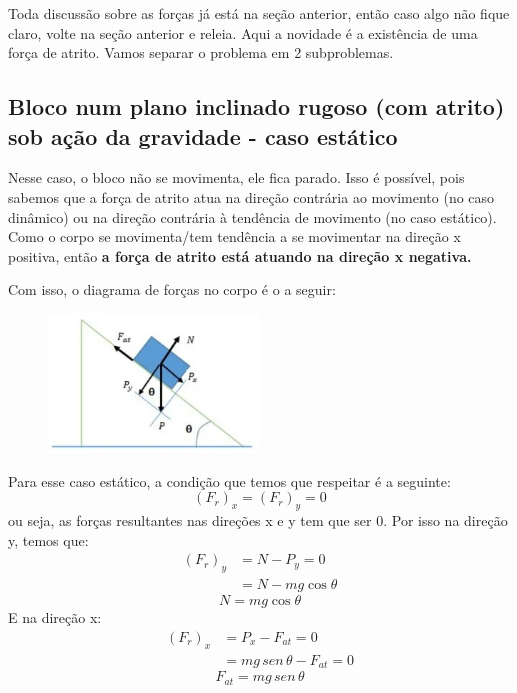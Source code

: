 \documentclass[12pt]{extarticle}
\newcommand{\<}{\langle}
\renewcommand{\>}{\rangle}
\theoremstyle{definition}
\begin{document}
Toda discussão sobre as forças já está na seção anterior, então caso algo não fique claro, volte na seção anterior e releia. Aqui a novidade é a existência de uma força de atrito. Vamos separar o problema em 2 subproblemas.
\subsection{Bloco num plano inclinado rugoso (com atrito) sob ação da gravidade - caso estático}

Nesse caso, o bloco não se movimenta, ele fica parado. Isso é possível, pois sabemos que a força de atrito atua na direção contrária ao movimento (no caso dinâmico) ou na direção contrária à tendência de movimento (no caso estático). Como o corpo se movimenta/tem tendência a se movimentar na direção x positiva, então \textbf{a força de atrito está atuando na direção x negativa.}

Com isso, o diagrama de forças no corpo é o a seguir:
\begin{figure}[H]
    \centering
    \includegraphics[width=0.5\textwidth]{atrito_estatico.png}
    \label{fig:atrito_estatico}
\end{figure}

Para esse caso estático, a condição que temos que respeitar é a seguinte:
\begin{equation}
    (F_r)_x = (F_r)_y = 0
\end{equation}
\noindent ou seja, as forças resultantes nas direções x e y tem que ser 0. Por isso na direção y, temos que:
\begin{align*}
    (F_r)_y &= N - P_y =0\\
    &= N - mg\cos\theta
\end{align*}
\begin{equation}
    N = mg\cos\theta
\end{equation}
E na direção x:
\begin{align*}
    (F_r)_x &= P_x - F_{at}=0 \\
    &= mg\,sen\,\theta - F_{at} =0
\end{align*}
\begin{equation}
    F_{at} = mg\,sen\,\theta
\end{equation}
\end{document}
